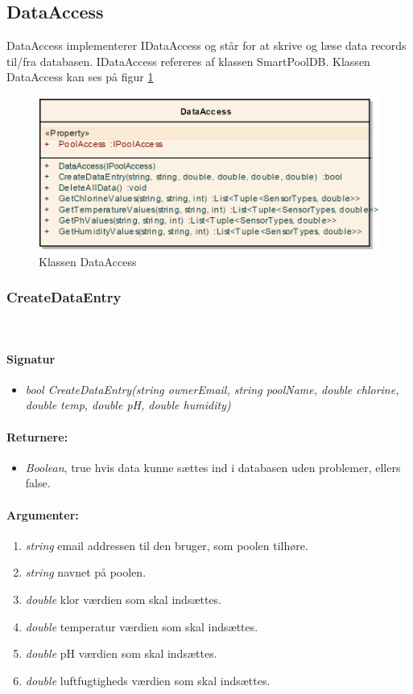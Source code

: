 \subsection{DataAccess}
DataAccess implementerer IDataAccess og står for at skrive og læse data records til/fra databasen.
IDataAccess refereres af klassen SmartPoolDB. Klassen DataAccess kan ses på figur \ref{fig:dataAccessClassNoInherit}

\begin{figure}
\centering
\includegraphics[width=0.7\linewidth]{figs/implementering/dataAccessClassNoInherit}
\caption{Klassen DataAccess}
\label{fig:dataAccessClassNoInherit}
\end{figure}

\subsubsection{CreateDataEntry}\ %

\paragraph{Signatur}
\begin{itemize}
	\item \textit{bool CreateDataEntry(string ownerEmail, string poolName, double chlorine, double temp, double pH, double humidity)}
\end{itemize}

\paragraph{Returnere:}
\begin{itemize}
	\item \textit{Boolean}, true hvis data kunne sættes ind i databasen uden problemer, ellers false.
\end{itemize}

\paragraph{Argumenter:}
\begin{enumerate}
	\item \textit{string} email addressen til den bruger, som poolen tilhøre.
	\item \textit{string} navnet på poolen.
	\item \textit{double} klor værdien som skal indsættes.
	\item \textit{double} temperatur værdien som skal indsættes.
	\item \textit{double} pH værdien som skal indsættes.
	\item \textit{double} luftfugtigheds værdien som skal indsættes.
\end{enumerate}

